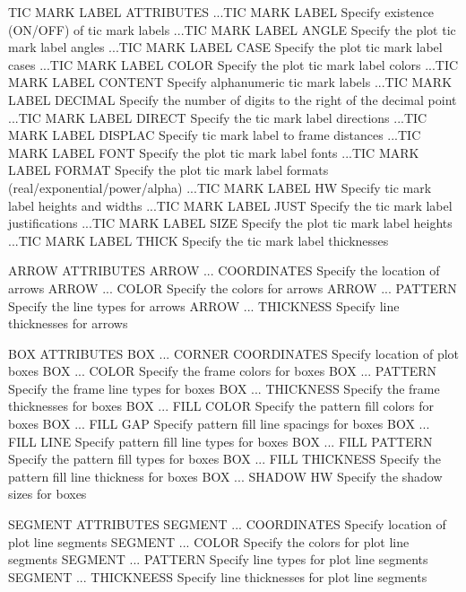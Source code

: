 TIC MARK LABEL ATTRIBUTES
   ...TIC MARK LABEL          Specify existence (ON/OFF) of tic mark labels
   ...TIC MARK LABEL ANGLE    Specify the plot tic mark label angles
   ...TIC MARK LABEL CASE     Specify the plot tic mark label cases
   ...TIC MARK LABEL COLOR    Specify the plot tic mark label colors
   ...TIC MARK LABEL CONTENT  Specify alphanumeric tic mark labels
   ...TIC MARK LABEL DECIMAL  Specify the number of digits to the right
                              of the decimal point
   ...TIC MARK LABEL DIRECT   Specify the tic mark label directions
   ...TIC MARK LABEL DISPLAC  Specify tic mark label to frame distances
   ...TIC MARK LABEL FONT     Specify the plot tic mark label fonts
   ...TIC MARK LABEL FORMAT   Specify the plot tic mark label formats
                              (real/exponential/power/alpha)
   ...TIC MARK LABEL HW       Specify tic mark label heights and widths
   ...TIC MARK LABEL JUST     Specify the tic mark label justifications
   ...TIC MARK LABEL SIZE     Specify the plot tic mark label heights
   ...TIC MARK LABEL THICK    Specify the tic mark label thicknesses
 
ARROW ATTRIBUTES
   ARROW ... COORDINATES      Specify the location of arrows
   ARROW ... COLOR            Specify the colors for arrows
   ARROW ... PATTERN          Specify the line types for arrows
   ARROW ... THICKNESS        Specify line thicknesses for arrows
 
BOX ATTRIBUTES
   BOX ... CORNER COORDINATES Specify location of plot boxes
   BOX ... COLOR              Specify the frame colors for boxes
   BOX ... PATTERN            Specify the frame line types for boxes
   BOX ... THICKNESS          Specify the frame thicknesses for boxes
   BOX ... FILL COLOR         Specify the pattern fill colors for boxes
   BOX ... FILL GAP           Specify pattern fill line spacings for
                              boxes
   BOX ... FILL LINE          Specify pattern fill line types for boxes
   BOX ... FILL PATTERN       Specify the pattern fill types for boxes
   BOX ... FILL THICKNESS     Specify the pattern fill line thickness
                              for boxes
   BOX ... SHADOW HW          Specify the shadow sizes for boxes
 
SEGMENT ATTRIBUTES
   SEGMENT ... COORDINATES    Specify location of plot line segments
   SEGMENT ... COLOR          Specify the colors for plot line segments
   SEGMENT ... PATTERN        Specify line types for plot line segments
   SEGMENT ... THICKNEESS     Specify line thicknesses for plot line
                              segments
 
